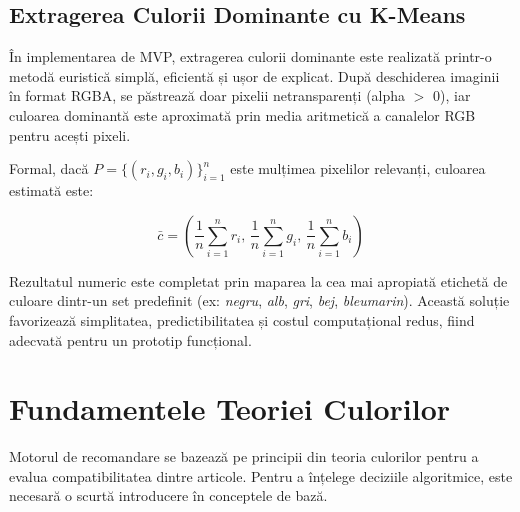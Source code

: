 \subsection{Extragerea Culorii Dominante cu K-Means}
În implementarea de MVP, extragerea culorii dominante este realizată printr-o metodă euristică simplă, eficientă și ușor de explicat. După deschiderea imaginii în format RGBA, se păstrează doar pixelii netransparenți (alpha $>$ 0), iar culoarea dominantă este aproximată prin media aritmetică a canalelor RGB pentru acești pixeli.

Formal, dacă $P=\{(r_i,g_i,b_i)\}_{i=1}^{n}$ este mulțimea pixelilor relevanți, culoarea estimată este:

\begin{equation}
\bar{c} = \left(\frac{1}{n}\sum_{i=1}^{n} r_i,\, \frac{1}{n}\sum_{i=1}^{n} g_i,\, \frac{1}{n}\sum_{i=1}^{n} b_i\right)
\end{equation}

Rezultatul numeric este completat prin maparea la cea mai apropiată etichetă de culoare dintr-un set predefinit (ex: \textit{negru}, \textit{alb}, \textit{gri}, \textit{bej}, \textit{bleumarin}). Această soluție favorizează simplitatea, predictibilitatea și costul computațional redus, fiind adecvată pentru un prototip funcțional.

\section{Fundamentele Teoriei Culorilor}
\label{sec:color_theory}

Motorul de recomandare se bazează pe principii din teoria culorilor pentru a evalua compatibilitatea dintre articole. Pentru a înțelege deciziile algoritmice, este necesară o scurtă introducere în conceptele de bază.

